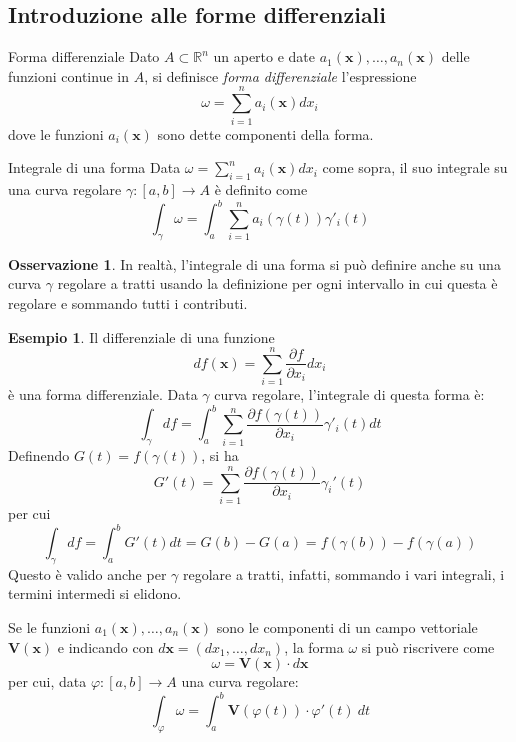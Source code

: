 \documentclass[10pt, a4paper]{scrartcl}
\theoremstyle{definition}
\newtheorem{esempio}{Esempio}
\numberwithin{esempio}{section}
\theoremstyle{definition}
\newtheorem{obs}{Osservazione}
\numberwithin{obs}{section}
\numberwithin{nota}{section}
\numberwithin{equation}{subsection}
\begin{document}
\subsection{Introduzione alle forme differenziali}
\begin{definizione}
	{Forma differenziale}{}
	Dato $A \subset \mathbb{R}^n$ un aperto e date $a_1(\mathbf{x} ), \ldots, a_n (\mathbf{x} )$ delle funzioni continue in $A$, si definisce \textit{forma differenziale} l'espressione
	\[
	\omega = \sum_{i=1}^{n} a_i (\mathbf{x} ) dx_i
	\] 
dove le funzioni $a_i\mathbf{(x)} $ sono dette componenti della forma.
\end{definizione}
\begin{definizione}
	{Integrale di una forma}{}
	Data $\omega = \sum_{i=1}^{n} a_i(\mathbf{x} ) dx_i$ come sopra, il suo integrale su una curva regolare $\gamma:\left[ a,b \right] \to A$ \`e definito come
	\[
	\int_{\gamma} \omega = \int_{a} ^b \sum_{i=1}^{n} a_i(\gamma(t)) \gamma'_i(t)
	\] 
\end{definizione}
\begin{obs}
	In realt\`a, l'integrale di una forma si pu\`o definire anche su una curva $\gamma$ regolare a tratti usando la definizione per ogni intervallo in cui questa \`e regolare e sommando tutti i contributi.
\end{obs}
\begin{esempio}
Il differenziale di una funzione
\[
df(\mathbf{x} ) = \sum_{i=1}^{n} \frac{\partial f}{\partial x_i} dx_i
\] 
\`e una forma differenziale.
Data $\gamma$ curva regolare, l'integrale di questa forma \`e:
\[
\int_{\gamma}  df = \int_{a} ^b \sum_{i=1}^{n} \frac{\partial f(\gamma(t))}{\partial x_i} \gamma'_i(t) dt 
\] 
Definendo $G(t) = f(\gamma(t))$, si ha
\[
G'(t) = \sum_{i=1}^{n} \frac{\partial f(\gamma(t))}{\partial x_i} \gamma_i'(t)
\] 
per cui
\[
\int_{\gamma} df = \int_{a} ^b G'(t) dt = G(b) - G(a) = f(\gamma(b)) - f(\gamma(a))
\] 
Questo \`e valido anche per $\gamma$ regolare a tratti, infatti, sommando i vari integrali, i termini intermedi si elidono.
\end{esempio}
Se le funzioni $a_1(\mathbf{x} ), \ldots, a_n(\mathbf{x} )$ sono le componenti di un campo vettoriale $\mathbf{V} (\mathbf{x})$ e indicando con $d\mathbf{x} = (dx_1, \ldots, dx_n)$, la forma $\omega$ si pu\`o riscrivere come
\begin{equation*}
	\omega = \mathbf{V} (\mathbf{x} ) \cdot d\mathbf{x} 
\end{equation*}
per cui, data $\varphi:\left[ a,b \right] \to A $ una curva regolare:
\[
\int_{\varphi } \omega = \int_{a} ^b \mathbf{V} (\varphi (t)) \cdot \varphi '(t) \ dt 
\] 
\end{document}
